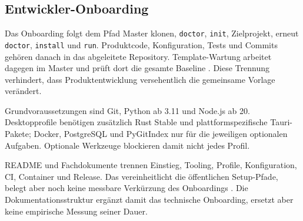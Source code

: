 \subsection{Entwickler-Onboarding}
\label{subsec:entwickler-onboarding}

Das Onboarding folgt dem Pfad Master klonen, \texttt{doctor}, \texttt{init},
Zielprojekt, erneut \texttt{doctor}, \texttt{install} und \texttt{run}.
Produktcode, Konfiguration, Tests und Commits gehören danach in das abgeleitete
Repository. Template-Wartung arbeitet dagegen im Master und prüft dort die
gesamte Baseline
\parencite{kleiveist2026template,kleiveist2026profiles}.
Diese Trennung verhindert, dass Produktentwicklung versehentlich die gemeinsame
Vorlage verändert.

Grundvoraussetzungen sind Git, Python ab 3.11 und Node.js ab 20. Desktopprofile
benötigen zusätzlich Rust Stable und plattformspezifische Tauri-Pakete;
Docker, PostgreSQL und PyGitIndex nur für die jeweiligen optionalen Aufgaben.
Optionale Werkzeuge blockieren damit nicht jedes Profil.

README und Fachdokumente trennen Einstieg, Tooling, Profile, Konfiguration, CI,
Container und Release. Das vereinheitlicht die öffentlichen Setup-Pfade,
belegt aber noch keine messbare Verkürzung des Onboardings
\parencite{kleiveist2026tooling,kleiveist2026configuration,kleiveist2026ci,kleiveist2026release}.
Die Dokumentationsstruktur ergänzt damit das technische Onboarding, ersetzt
aber keine empirische Messung seiner Dauer.
